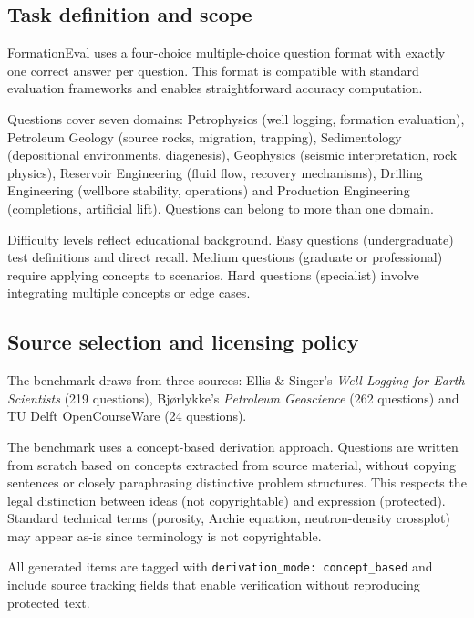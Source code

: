 \documentclass[11pt]{article}
\begin{document}
\subsection{Task definition and scope}

FormationEval uses a four-choice multiple-choice question format with exactly one correct answer per question. This format is compatible with standard evaluation frameworks and enables straightforward accuracy computation.

Questions cover seven domains: Petrophysics (well logging, formation evaluation), Petroleum Geology (source rocks, migration, trapping), Sedimentology (depositional environments, diagenesis), Geophysics (seismic interpretation, rock physics), Reservoir Engineering (fluid flow, recovery mechanisms), Drilling Engineering (wellbore stability, operations) and Production Engineering (completions, artificial lift). Questions can belong to more than one domain.

Difficulty levels reflect educational background. Easy questions (undergraduate) test definitions and direct recall. Medium questions (graduate or professional) require applying concepts to scenarios. Hard questions (specialist) involve integrating multiple concepts or edge cases.


\subsection{Source selection and licensing policy}

The benchmark draws from three sources: Ellis \& Singer's \textit{Well Logging for Earth Scientists} \cite{ellis_singer_2007} (219 questions), Bj{\o}rlykke's \textit{Petroleum Geoscience} \cite{bjorlykke_2010} (262 questions) and TU Delft OpenCourseWare \cite{tudelft_ocw_2008} (24 questions).

The benchmark uses a concept-based derivation approach. Questions are written from scratch based on concepts extracted from source material, without copying sentences or closely paraphrasing distinctive problem structures. This respects the legal distinction between ideas (not copyrightable) and expression (protected). Standard technical terms (porosity, Archie equation, neutron-density crossplot) may appear as-is since terminology is not copyrightable.

All generated items are tagged with \texttt{derivation\_mode: concept\_based} and include source tracking fields that enable verification without reproducing protected text.
\end{document}
